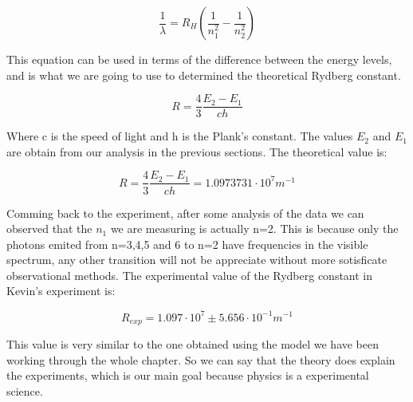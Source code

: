 \begin{equation}
\frac{1}{\lambda} = R_H \left(\frac{1}{n_1^2}-\frac{1}{n_2^2}\right)
\end{equation}

This equation can be used in terms of the difference between the energy levels, and is what we are going to use to determined the theoretical Rydberg constant.

\begin{equation}
  R = \frac{4}{3} \frac{E_2-E_1}{c h}
\end{equation}

Where c is the speed of light and h is the Plank's constant. The values $E_2$ and $E_1$ are obtain from our analysis in the previous sections. The theoretical value is:

\begin{equation}
  R = \frac{4}{3} \frac{E_2-E_1}{c h} = 1.0973731 \cdot 10^7 m^{-1}
\end{equation}

Comming back to the experiment, after some analysis of the data we can observed that the $n_1$ we are measuring is actually n=2. This is because only the photons emited from n=3,4,5 and 6 to n=2 have frequencies in the visible spectrum, any other transition will not be appreciate without more sotisficate observational methods. The experimental value of the Rydberg constant in Kevin's experiment is:

\begin{equation}
  R_{exp} = 1.097 \cdot 10^7 \pm 5.656 \cdot 10^{-1} m^{-1}
\end{equation}

This value is very similar to the one obtained using the model we have been working through the whole chapter. So we can say that the theory does explain the experiments, which is our main goal because physics is a experimental science.
